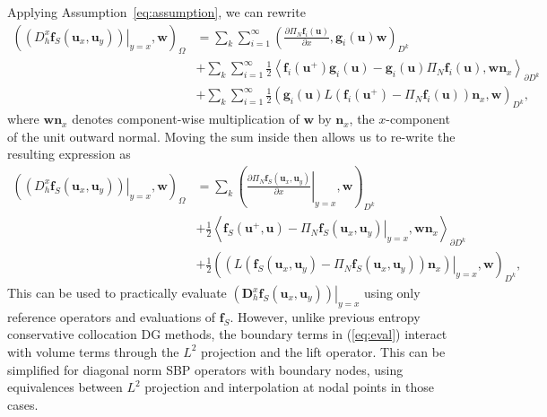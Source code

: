 \documentclass[preprint,10pt]{article}
\theoremstyle{definition}
\theoremstyle{lemma}
\theoremstyle{theorem}
\theoremstyle{assumption}
\newcommand{\pd}[2]{\frac{\partial#1}{\partial#2}}
\newcommand{\LRp}[1]{\left( #1 \right)}
\newcommand{\LRa}[1]{\left\langle #1 \right\rangle}
\begin{document}
Applying Assumption~\ref{eq:assumption}, we can rewrite 
\begin{align*}
\LRp{\left.\LRp{D^x_h \bm{f}_S(\bm{u}_x,\bm{u}_y)}\right|_{y=x},\bm{w}}_{\Omega} &= \sum_k \sum_{i=1}^{\infty} \LRp{\pd{\Pi_N \bm{f}_i(\bm{u})}{x},\bm{g}_i(\bm{u})\bm{w}}_{D^k}\\ 
&+  \sum_k \sum_{i=1}^{\infty}\frac{1}{2}\LRa{\bm{f}_i(\bm{u}^+)\bm{g}_i(\bm{u}) - \bm{g}_i(\bm{u})\Pi_N\bm{f}_i(\bm{u}),\bm{w}\bm{n}_x}_{\partial D^k}\\
&+  \sum_k \sum_{i=1}^{\infty}\frac{1}{2}\LRp{\bm{g}_i(\bm{u})L\LRp{\bm{f}_i(\bm{u}^+) - \Pi_N\bm{f}_i(\bm{u})}\bm{n}_x,\bm{w}}_{D^k},
\end{align*}
where $\bm{w}\bm{n}_x$ denotes component-wise multiplication of $\bm{w}$ by $\bm{n}_x$, the $x$-component of the unit outward normal.  Moving the sum inside then allows us to re-write the resulting expression as
\begin{align}
\LRp{\left.\LRp{D^x_h \bm{f}_S(\bm{u}_x,\bm{u}_y)}\right|_{y=x},\bm{w}}_{\Omega} &= \sum_k \LRp{\left.\pd{\Pi_N \bm{f}_S(\bm{u}_x,\bm{u}_y)}{x}\right|_{y=x},\bm{w}}_{D^k}\nonumber\\ 
&+ \frac{1}{2}\LRa{\bm{f}_S(\bm{u}^+,\bm{u}) - \left.\Pi_N\bm{f}_S(\bm{u}_x,\bm{u}_y)\right|_{y=x},\bm{w}\bm{n}_x}_{\partial D^k} \label{eq:eval}\\
&+ \frac{1}{2}\LRp{\left.\LRp{L\LRp{\bm{f}_S(\bm{u}_x,\bm{u}_y) - \Pi_N\bm{f}_S(\bm{u}_x,\bm{u}_y)}\bm{n}_x}\right|_{y=x},\bm{w}}_{D^k},\nonumber
\end{align}
This can be used to practically evaluate $\left.\LRp{\bm{D}^x_h \bm{f}_S(\bm{u}_x,\bm{u}_y)}\right|_{y=x}$ using only reference operators and evaluations of $\bm{f}_S$.  However, unlike previous entropy conservative collocation DG methods, the boundary terms in (\ref{eq:eval}) interact with volume terms through the $L^2$ projection and the lift operator.  This can be simplified for diagonal norm SBP operators with boundary nodes, using equivalences between $L^2$ projection and interpolation at nodal points in those cases.  
\end{document}
